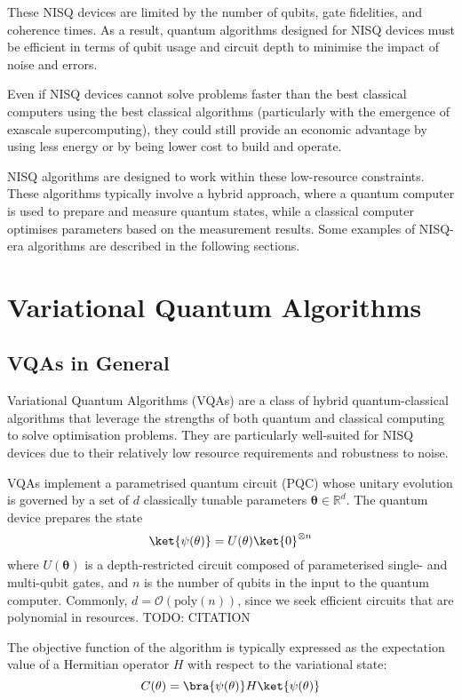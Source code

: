 These NISQ devices are limited by the number of qubits, gate fidelities, and coherence times. As a result, quantum algorithms designed for NISQ devices must be efficient in terms of qubit usage and circuit depth to minimise the impact of noise and errors. 

Even if NISQ devices cannot solve problems faster than the best classical computers using the best classical algorithms (particularly with the emergence of exascale supercomputing), they could still provide an economic advantage by using less energy or by being lower cost to build and operate.

NISQ algorithms are designed to work within these low-resource constraints. These algorithms typically involve a hybrid approach, where a quantum computer is used to prepare and measure quantum states, while a classical computer optimises parameters based on the measurement results. Some examples of NISQ-era algorithms are described in the following sections.

\section{Variational Quantum Algorithms}
\subsection{VQAs in General}
Variational Quantum Algorithms (VQAs) are a class of hybrid quantum-classical algorithms that leverage the strengths of both quantum and classical computing to solve optimisation problems. They are particularly well-suited for NISQ devices due to their relatively low resource requirements and robustness to noise.

VQAs implement a parametrised quantum circuit (PQC) whose unitary evolution is governed by a set of $d$ classically tunable parameters $\mathbf{\theta}\in\mathbb{R}^d$. The quantum device prepares the state
$$\ket{\psi(\mathbf{\theta})}=U(\mathbf{\theta})\ket{0}^{\otimes n}$$
where $U(\mathbf{\theta})$ is a depth-restricted circuit composed of parameterised single- and multi-qubit gates, and $n$ is the number of qubits in the input to the quantum computer. Commonly, $d=\mathcal{O}(\text{poly}(n))$, since we seek efficient circuits that are polynomial in resources. TODO: CITATION

The objective function of the algorithm is typically expressed as the expectation value of a Hermitian operator $H$ with respect to the variational state:
$$C(\mathbf{\theta})= \bra{\psi(\mathbf{\theta})}H\ket{\psi(\mathbf{\theta})} $$

